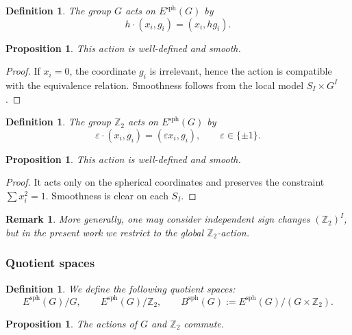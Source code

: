 \documentclass[11pt]{amsart}
\newtheorem{proposition}[theorem]{Proposition}
\newtheorem{definition}[theorem]{Definition}
\newtheorem{remark}[theorem]{Remark}
\begin{document}
\begin{definition}
The group $G$ acts on $E^{\mathrm{sph}}(G)$ by
\[
h \cdot (x_i,g_i) = (x_i, hg_i).
\]
\end{definition}

\begin{proposition}
This action is well-defined and smooth.
\end{proposition}

\begin{proof}
If $x_i=0$, the coordinate $g_i$ is irrelevant, hence the action is compatible with the equivalence relation. Smoothness follows from the local model $S_I \times G^I$.
\end{proof}

\begin{definition}
The group $\mathbb{Z}_2$ acts on $E^{\mathrm{sph}}(G)$ by
\[
\varepsilon \cdot (x_i,g_i) = (\varepsilon x_i,g_i),
\qquad \varepsilon \in \{\pm 1\}.
\]
\end{definition}

\begin{proposition}
This action is well-defined and smooth.
\end{proposition}

\begin{proof}
It acts only on the spherical coordinates and preserves the constraint $\sum x_i^2=1$. Smoothness is clear on each $S_I$.
\end{proof}

\begin{remark}
More generally, one may consider independent sign changes $(\mathbb{Z}_2)^I$, but in the present work we restrict to the global $\mathbb{Z}_2$-action.
\end{remark}

\subsubsection{Quotient spaces}

\begin{definition}
We define the following quotient spaces:
\[
E^{\mathrm{sph}}(G)/G,
\qquad
E^{\mathrm{sph}}(G)/\mathbb{Z}_2,
\qquad
B^{\mathrm{sph}}(G) := E^{\mathrm{sph}}(G)/(G \times \mathbb{Z}_2).
\]
\end{definition}

\begin{proposition}
The actions of $G$ and $\mathbb{Z}_2$ commute.
\end{proposition}
\end{document}
